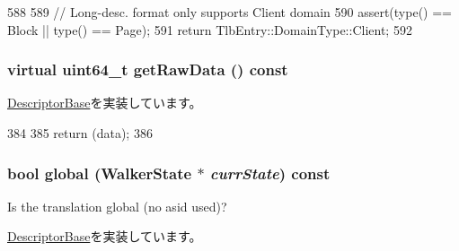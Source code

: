\begin{DoxyCode}
588         {
589             // Long-desc. format only supports Client domain
590             assert(type() == Block || type() == Page);
591             return TlbEntry::DomainType::Client;
592         }
\end{DoxyCode}
\hypertarget{classArmISA_1_1TableWalker_1_1LongDescriptor_a22438a8aab2360360239d433b2f8fc50}{
\subsubsection[{getRawData}]{\setlength{\rightskip}{0pt plus 5cm}virtual uint64\_\-t getRawData () const}}
\label{classArmISA_1_1TableWalker_1_1LongDescriptor_a22438a8aab2360360239d433b2f8fc50}


\hyperlink{classArmISA_1_1TableWalker_1_1DescriptorBase_a2d8a1d7c99e0e52420d8be6cbd821697}{DescriptorBase}を実装しています。


\begin{DoxyCode}
384         {
385             return (data);
386         }
\end{DoxyCode}
\hypertarget{classArmISA_1_1TableWalker_1_1LongDescriptor_ad6798ebc36be05efa22b3fb9f3702d83}{
\subsubsection[{global}]{\setlength{\rightskip}{0pt plus 5cm}bool global ({\bf WalkerState} $\ast$ {\em currState}) const}}
\label{classArmISA_1_1TableWalker_1_1LongDescriptor_ad6798ebc36be05efa22b3fb9f3702d83}
Is the translation global (no asid used)? 

\hyperlink{classArmISA_1_1TableWalker_1_1DescriptorBase_a87704122ae25a982d2e3d92c5b0e9c25}{DescriptorBase}を実装しています。


